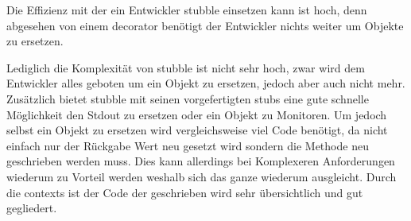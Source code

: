 Die Effizienz mit der ein Entwickler stubble einsetzen kann ist hoch, denn abgesehen von einem
\gls{decorator} benötigt der Entwickler nichts weiter um Objekte zu ersetzen.

Lediglich die Komplexität von stubble ist nicht sehr hoch, zwar wird dem Entwickler alles geboten um
ein Objekt zu ersetzen, jedoch aber auch nicht mehr. Zusätzlich bietet stubble mit seinen
vorgefertigten \Glspl{stub} eine gute schnelle Möglichkeit den Stdout zu ersetzen oder ein Objekt
zu Monitoren.
Um jedoch selbst ein Objekt zu ersetzen wird vergleichsweise viel Code benötigt, da
nicht einfach nur der Rückgabe Wert neu gesetzt wird sondern die Methode neu geschrieben werden muss.
Dies kann allerdings bei Komplexeren Anforderungen wiederum zu Vorteil werden weshalb sich das ganze
wiederum ausgleicht.
Durch die \Glspl{context} ist der Code der geschrieben wird sehr übersichtlich und gut gegliedert.